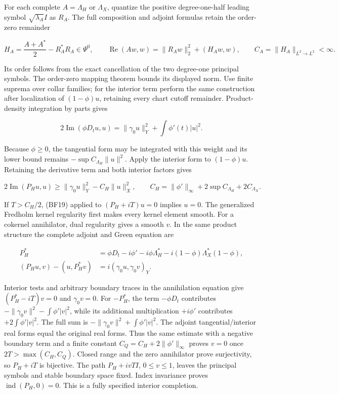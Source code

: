 \documentclass[
  11pt,
]{article}
\begin{document}
For each complete \(A=\Lambda_H\) or \(\Lambda_X\), quantize the
positive degree-one-half leading symbol \(\sqrt{\lambda_A}I\) as
\(R_A\). The full composition and adjoint formulas retain the order-zero
remainder

\[
 H_A=\frac{A+A^*}{2}-R_A^*R_A\in\Psi^0,
 \qquad \operatorname{Re}(Aw,w)=\|R_Aw\|_2^2+(H_Aw,w),
 \qquad C_A=\|H_A\|_{L^2\to L^2}<\infty.
 \tag{BF17}
\]

Its order follows from the exact cancellation of the two degree-one
principal symbols. The order-zero mapping theorem bounds its displayed
norm. Use finite suprema over collar families; for the interior term
perform the same construction after localization of \((1-\phi)u\),
retaining every chart cutoff remainder. Product-density integration by
parts gives

\[
 2\operatorname{Im}(\phi D_tu,u)
 =\|\gamma_0u\|_Y^2+\int\phi'(t)|u|^2.
 \tag{BF18}
\]

Because \(\phi\ge0\), the tangential form may be integrated with this
weight and its lower bound remains \(-\sup C_{\Lambda_H}\|u\|^2\). Apply
the interior form to \((1-\phi)u\). Retaining the derivative term and
both interior factors gives

\[
 2\operatorname{Im}(P_Hu,u)
 \ge\|\gamma_0u\|_Y^2-C_H\|u\|_X^2,
 \qquad C_H=\|\phi'\|_\infty+2\sup C_{\Lambda_H}+2C_{\Lambda_X}.
 \tag{BF19}
\]

If \(T>C_H/2\), (BF19) applied to \((P_H+iT)u=0\) implies \(u=0\). The
generalized Fredholm kernel regularity first makes every kernel element
smooth. For a cokernel annihilator, dual regularity gives a smooth
\(v\). In the same product structure the complete adjoint and Green
equation are

\[
 \begin{aligned}
 P_H^*&=\phi D_t-i\phi'-i\phi\Lambda_H^*
            -i(1-\phi)\Lambda_X^*(1-\phi),\\
 (P_Hu,v)-(u,P_H^*v)&=i(\gamma_0u,\gamma_0v)_Y.
 \end{aligned}
 \tag{BF20}
\]

Interior tests and arbitrary boundary traces in the annihilation
equation give \((P_H^*-iT)v=0\) and \(\gamma_0v=0\). For \(-P_H^*\), the
term \(-\phi D_t\) contributes \(-\|\gamma_0v\|^2-\int\phi'|v|^2\),
while its additional multiplication \(+i\phi'\) contributes
\(+2\int\phi'|v|^2\). The full sum is
\(-\|\gamma_0v\|^2+\int\phi'|v|^2\). The adjoint tangential/interior
real forms equal the original real forms. Thus the same estimate with a
negative boundary term and a finite constant
\(C_Q=C_H+2\|\phi'\|_\infty\) proves \(v=0\) once \(2T>\max(C_H,C_Q)\).
Closed range and the zero annihilator prove surjectivity, so \(P_H+iT\)
is bijective. The path \(P_H+ivTI\), \(0\le v\le1\), leaves the
principal symbols and stable boundary space fixed. Index invariance
proves \(\operatorname{ind}(P_H,0)=0\). This is a fully specified
interior completion.
\end{document}

